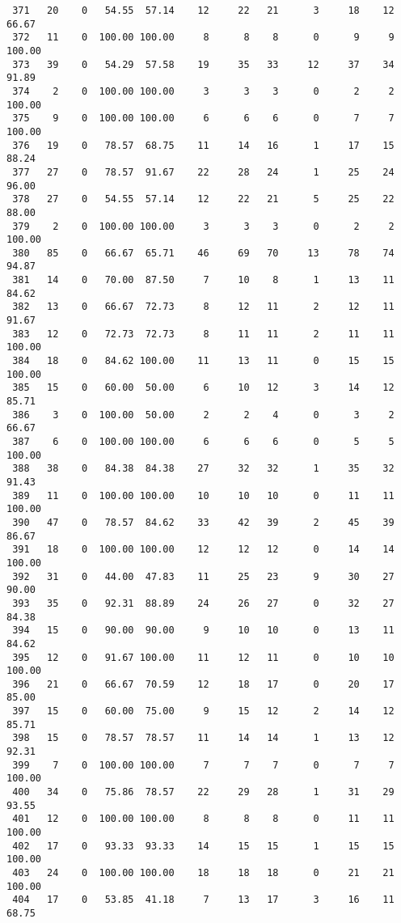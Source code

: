 \begin{verbatim}
 371   20    0   54.55  57.14    12     22   21      3     18    12    66.67
 372   11    0  100.00 100.00     8      8    8      0      9     9   100.00
 373   39    0   54.29  57.58    19     35   33     12     37    34    91.89
 374    2    0  100.00 100.00     3      3    3      0      2     2   100.00
 375    9    0  100.00 100.00     6      6    6      0      7     7   100.00
 376   19    0   78.57  68.75    11     14   16      1     17    15    88.24
 377   27    0   78.57  91.67    22     28   24      1     25    24    96.00
 378   27    0   54.55  57.14    12     22   21      5     25    22    88.00
 379    2    0  100.00 100.00     3      3    3      0      2     2   100.00
 380   85    0   66.67  65.71    46     69   70     13     78    74    94.87
 381   14    0   70.00  87.50     7     10    8      1     13    11    84.62
 382   13    0   66.67  72.73     8     12   11      2     12    11    91.67
 383   12    0   72.73  72.73     8     11   11      2     11    11   100.00
 384   18    0   84.62 100.00    11     13   11      0     15    15   100.00
 385   15    0   60.00  50.00     6     10   12      3     14    12    85.71
 386    3    0  100.00  50.00     2      2    4      0      3     2    66.67
 387    6    0  100.00 100.00     6      6    6      0      5     5   100.00
 388   38    0   84.38  84.38    27     32   32      1     35    32    91.43
 389   11    0  100.00 100.00    10     10   10      0     11    11   100.00
 390   47    0   78.57  84.62    33     42   39      2     45    39    86.67
 391   18    0  100.00 100.00    12     12   12      0     14    14   100.00
 392   31    0   44.00  47.83    11     25   23      9     30    27    90.00
 393   35    0   92.31  88.89    24     26   27      0     32    27    84.38
 394   15    0   90.00  90.00     9     10   10      0     13    11    84.62
 395   12    0   91.67 100.00    11     12   11      0     10    10   100.00
 396   21    0   66.67  70.59    12     18   17      0     20    17    85.00
 397   15    0   60.00  75.00     9     15   12      2     14    12    85.71
 398   15    0   78.57  78.57    11     14   14      1     13    12    92.31
 399    7    0  100.00 100.00     7      7    7      0      7     7   100.00
 400   34    0   75.86  78.57    22     29   28      1     31    29    93.55
 401   12    0  100.00 100.00     8      8    8      0     11    11   100.00
 402   17    0   93.33  93.33    14     15   15      1     15    15   100.00
 403   24    0  100.00 100.00    18     18   18      0     21    21   100.00
 404   17    0   53.85  41.18     7     13   17      3     16    11    68.75

\end{verbatim}

